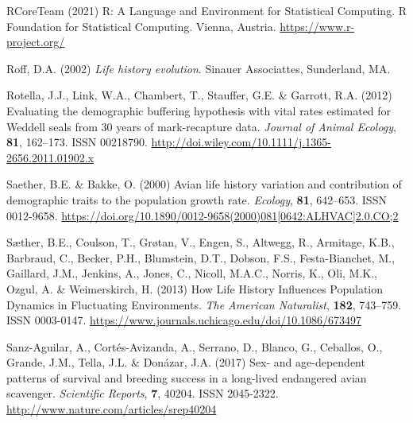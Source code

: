 \documentclass[12pt]{article}
\begin{document}
\begin{thebibliography}{87}
	RCoreTeam (2021) {R: A Language and Environment for Statistical Computing}.
	\newblock R Foundation for Statistical Computing.
	\newblock Vienna, Austria.
	\newline\urlprefix\url{https://www.r-project.org/}
	
	Roff, D.A. (2002) \emph{{Life history evolution}}.
	\newblock Sinauer Associattes, Sunderland, MA.
	
	Rotella, J.J., Link, W.A., Chambert, T., Stauffer, G.E. \& Garrott, R.A. (2012)
	{Evaluating the demographic buffering hypothesis with vital rates estimated
		for Weddell seals from 30 years of mark-recapture data}.
	\newblock \emph{Journal of Animal Ecology}, \textbf{81}, 162--173.
	\newblock ISSN 00218790.
	\newline\urlprefix\url{http://doi.wiley.com/10.1111/j.1365-2656.2011.01902.x}
	
	Saether, B.E. \& Bakke, O. (2000) {Avian life history variation and
		contribution of demographic traits to the population growth rate}.
	\newblock \emph{Ecology}, \textbf{81}, 642--653.
	\newblock ISSN 0012-9658.
	\newline\urlprefix\url{https://doi.org/10.1890/0012-9658(2000)081[0642:ALHVAC]2.0.CO;2}
	
	S{\ae}ther, B.E., Coulson, T., Gr{\o}tan, V., Engen, S., Altwegg, R., Armitage,
	K.B., Barbraud, C., Becker, P.H., Blumstein, D.T., Dobson, F.S.,
	Festa-Bianchet, M., Gaillard, J.M., Jenkins, A., Jones, C., Nicoll, M.A.C.,
	Norris, K., Oli, M.K., Ozgul, A. \& Weimerskirch, H. (2013) {How Life History
		Influences Population Dynamics in Fluctuating Environments}.
	\newblock \emph{The American Naturalist}, \textbf{182}, 743--759.
	\newblock ISSN 0003-0147.
	\newline\urlprefix\url{https://www.journals.uchicago.edu/doi/10.1086/673497}
	
	Sanz-Aguilar, A., Cort{\'{e}}s-Avizanda, A., Serrano, D., Blanco, G., Ceballos,
	O., Grande, J.M., Tella, J.L. \& Don{\'{a}}zar, J.A. (2017) {Sex- and
		age-dependent patterns of survival and breeding success in a long-lived
		endangered avian scavenger}.
	\newblock \emph{Scientific Reports}, \textbf{7}, 40204.
	\newblock ISSN 2045-2322.
	\newline\urlprefix\url{http://www.nature.com/articles/srep40204}
	

\end{thebibliography}
\end{document}
